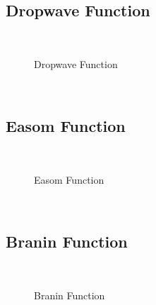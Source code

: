 \subsection{Dropwave Function}
~
\begin{figure}[ht]
	\centering
	\setlength \fboxsep{0pt}
	\setlength \fboxrule{0.5pt}
	\caption{Dropwave Function}
	\label{fig:DropwaveGraph}
\end{figure}
~
\subsection{Easom Function}
~
\begin{figure}[ht]
	\centering
	\setlength \fboxsep{0pt}
	\setlength \fboxrule{0.5pt}
	\caption{Easom Function}
	\label{fig:EasomGraph}
\end{figure}
~
\subsection{Branin Function}
~
\begin{figure}[ht]
	\centering
	\setlength \fboxsep{0pt}
	\setlength \fboxrule{0.5pt}
	\caption{Branin Function}
	\label{fig:BraninGraph}
\end{figure}
~
